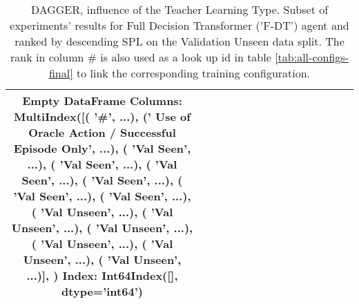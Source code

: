 \begin{table}
\centering
\caption{\label{tab:f_dt_dagger_pe_oa}DAGGER, influence of the Teacher Learning Type. Subset of experiments' results for Full Decision Transformer ('F-DT') agent and ranked by descending SPL on the Validation Unseen data split. The rank in column \# is also used as a look up id in table \ref{tab:all-configs-final} to link the corresponding training configuration.}
\begin{tabular}{@{\hskip3pt}c@{\hskip3pt}c@{\hskip3pt}c@{\hskip3pt}c@{\hskip3pt}c@{\hskip3pt}c@{\hskip3pt}c@{\hskip3pt}c@{\hskip3pt}c@{\hskip3pt}c@{\hskip3pt}c@{\hskip3pt}c@{\hskip3pt}c@{\hskip3pt}c@{\hskip3pt}c}
\toprule
Empty DataFrame
Columns: MultiIndex([(                                             '\textbf{\#}', ...),
            ('\textbf{ Use of Oracle Action / Successful Episode Only}', ...),
            (                                       '\textbf{Val Seen}', ...),
            (                                       '\textbf{Val Seen}', ...),
            (                                       '\textbf{Val Seen}', ...),
            (                                       '\textbf{Val Seen}', ...),
            (                                       '\textbf{Val Seen}', ...),
            (                                       '\textbf{Val Seen}', ...),
            (                                     '\textbf{Val Unseen}', ...),
            (                                     '\textbf{Val Unseen}', ...),
            (                                     '\textbf{Val Unseen}', ...),
            (                                     '\textbf{Val Unseen}', ...),
            (                                     '\textbf{Val Unseen}', ...),
            (                                     '\textbf{Val Unseen}', ...)],
           )
Index: Int64Index([], dtype='int64') \\
\bottomrule
\end{tabular}
\end{table}
